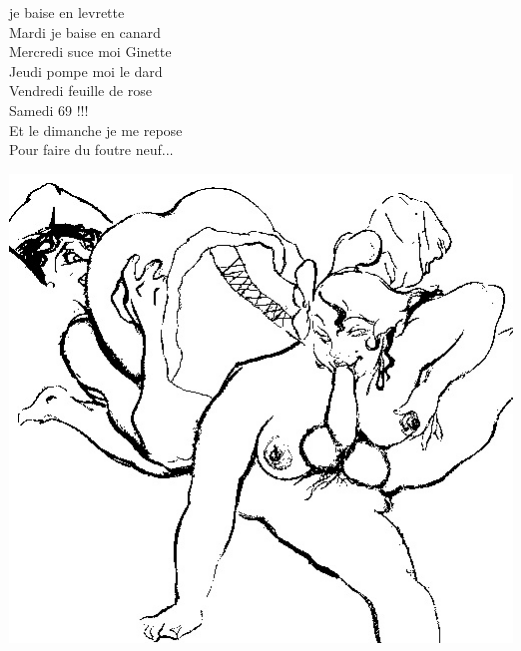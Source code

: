 
 je baise en levrette
\\Mardi je baise en canard
\\Mercredi suce moi Ginette
\\Jeudi pompe moi le dard
\\Vendredi feuille de rose
\\Samedi 69 !!!
\\Et le dimanche je me repose
\\Pour faire du foutre neuf...
\\
\bigskip
\begin{center}
\includegraphics[width=1\textwidth]{images/soixanteNeuf.jpg}
\end{center}

\breakpage